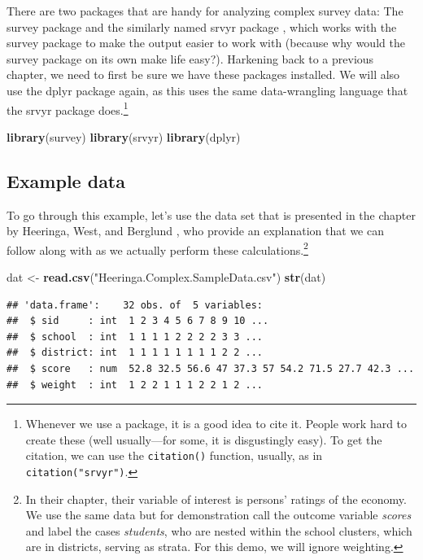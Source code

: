 \documentclass[
]{article}
\newenvironment{Shaded}{\begin{snugshade}}{\end{snugshade}}
\newcommand{\KeywordTok}[1]{\textcolor[rgb]{0.13,0.29,0.53}{\textbf{#1}}}
\newcommand{\NormalTok}[1]{#1}
\newcommand{\StringTok}[1]{\textcolor[rgb]{0.31,0.60,0.02}{#1}}
\begin{document}
There are two packages that are handy for analyzing complex survey data: The survey package \citep{R-survey} and the similarly named srvyr package \citep{R-srvyr}, which works with the survey package to make the output easier to work with (because why would the survey package on its own make life easy?). Harkening back to a previous chapter, we need to first be sure we have these packages installed. We will also use the dplyr package \citep{R-dplyr} again, as this uses the same data-wrangling language that the srvyr package does.\footnote{Whenever we use a package, it is a good idea to cite it. People work hard to create these (well usually---for some, it is disgustingly easy). To get the citation, we can use the \texttt{citation()} function, usually, as in \texttt{citation("srvyr")}. }

\begin{Shaded}
\begin{Highlighting}[]
\KeywordTok{library}\NormalTok{(survey)}
\KeywordTok{library}\NormalTok{(srvyr)}
\KeywordTok{library}\NormalTok{(dplyr)}
\end{Highlighting}
\end{Shaded}

\hypertarget{example-data}{%
\subsection{Example data}\label{example-data}}

To go through this example, let's use the data set that is presented in the chapter by Heeringa, West, and Berglund \citeyearpar[Chapter 2]{heeringa_applied_2010}, who provide an explanation that we can follow along with as we actually perform these calculations.\footnote{In their chapter, their variable of interest is persons' ratings of the economy. We use the same data but for demonstration call the outcome variable \emph{scores} and label the cases \emph{students}, who are nested within the school clusters, which are in districts, serving as strata. For this demo, we will ignore weighting.}

\begin{Shaded}
\begin{Highlighting}[]
\NormalTok{dat <-}\StringTok{ }\KeywordTok{read.csv}\NormalTok{(}\StringTok{"Heeringa.Complex.SampleData.csv"}\NormalTok{)}
\KeywordTok{str}\NormalTok{(dat)}
\end{Highlighting}
\end{Shaded}

\begin{verbatim}
## 'data.frame':    32 obs. of  5 variables:
##  $ sid     : int  1 2 3 4 5 6 7 8 9 10 ...
##  $ school  : int  1 1 1 1 2 2 2 2 3 3 ...
##  $ district: int  1 1 1 1 1 1 1 1 2 2 ...
##  $ score   : num  52.8 32.5 56.6 47 37.3 57 54.2 71.5 27.7 42.3 ...
##  $ weight  : int  1 2 2 1 1 1 2 2 1 2 ...
\end{verbatim}
\end{document}
